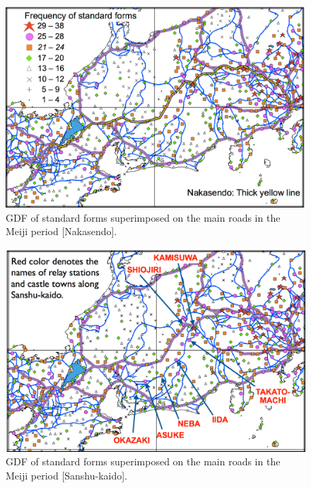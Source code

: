 \documentclass[output=paper]{LSP/langsci}
\begin{document}
\begin{figure}[p]
\includegraphics[height=0.4\textheight]{illustrations/kuma_fig09}
\caption{GDF of standard forms superimposed on the main roads in the Meiji period [Nakasendo].}          
\label{fig:9}
\end{figure}
\newpage	


\begin{figure}[p]
\includegraphics[height=0.4\textheight]{illustrations/kuma_fig10}
\caption{GDF of standard forms superimposed on the main roads in the Meiji period [Sanshu-kaido].}          
\label{fig:10}
\end{figure}
\clearpage
\end{document}
